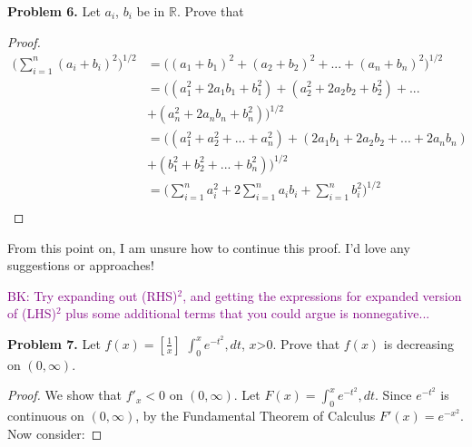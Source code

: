 \documentclass[12pt]{article}
\newcommand{\BK}[1]{\textcolor{purple}{BK: #1}}
\begin{document}
\begin{flushleft}\textbf{Problem 6.} Let $a_{i}$, $b_{i}$ be in $\mathbb{R}$. Prove that 

\vspace{.2cm}


\vspace{.2cm}

\begin{proof}
\begin{align*}
\big(\sum_{i=1}^{n} (a_{i}+b_{i})^{2}\big)^{1/2} 
	&= \big( (a_{1}+b_{1})^{2} + (a_{2}+b_{2})^{2}+...+(a_{n}+b_{n})^{2}\big)^{1/2} \\
	&= \big( (a_{1}^{2}+2a_{1}b_{1}+b_{1}^{2}) + (a_{2}^{2}+2a_{2}b_{2}+b_{2}^{2})+...\\
	&+ (a_{n}^{2}+2a_{n}b_{n}+b_{n}^{2}) \big)^{1/2} \\
	&= \big( (a_{1}^{2}+a_{2}^{2}+...+a_{n}^{2}) + (2a_{1}b_{1}+2a_{2}b_{2}+...+2a_{n}b_{n}) \\ &+ (b_{1}^{2}+b_{2}^{2}+...+b_{n}^{2}) \big)^{1/2} \\
	&= \big( \sum_{i=1}^{n} a_{i}^{2} + 2\sum_{i=1}^{n} a_{i}b_{i} + \sum_{i=1}^{n} b_{i}^{2} \big)^{1/2} \\
\end{align*}
\end{proof}
\color{red} From this point on, I am unsure how to continue this proof. I'd love any suggestions or approaches!
%
\begin{flushleft}
  \BK{Try expanding out (RHS)$^2$, and getting the expressions for expanded version of (LHS)$^2$ plus some additional terms that you could argue is nonnegative...}
\end{flushleft}


\vspace{.2cm} 

\color{black}

\textbf{Problem 7.} Let $f(x)=[\frac{1}{x}]$  $\int_{0}^{x} e^{-t^{2}}, dt$, $x$>0. Prove that $f(x)$ is decreasing on $(0, \infty)$. 

\vspace{.2cm}

\begin{proof} 
We show that $f'_{x}<0$ on $(0, \infty)$. Let $F(x)= \int_{0}^{x} e^{-t^{2}}, dt$. Since $e^{-t^{2}}$ is continuous on $(0, \infty)$, by the Fundamental Theorem of Calculus $F'(x)=e^{-x^{2}}$. Now consider:


\end{proof}
\end{flushleft}
\end{document}
